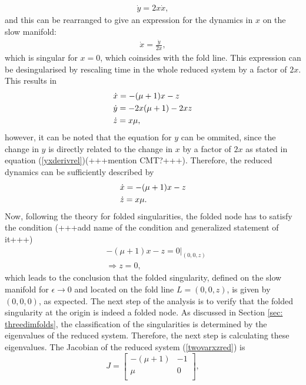 \begin{align} \label{yxderivrel}
\dot{y} = 2x \dot{x},
\end{align}
 and this can be rearranged to give an expression for the dynamics in $x$ on the slow manifold:
\begin{align*}
\dot{x}= \frac{\dot{y}}{2x},
\end{align*}
which is singular for $x=0$, which coinsides with the fold line.
This expression can be desingularised by rescaling time in the whole reduced system by a factor of $2x$. This results in
\begin{align} \label{fullredsysformmo}
&\dot{x} = -(\mu+1)x - z \notag \\
&\dot{y} = - 2x (\mu +1) -2xz\\
&\dot{z} = x \mu \notag,
\end{align}
however, it can be noted that the equation for $y$ can be ommited, since the change in $y$ is directly related to the change in $x$ by a factor of $2x$ as stated in equation (\ref{yxderivrel})(+++mention CMT?+++). Therefore, the reduced dynamics can be sufficiently described by
\begin{align}\label{twovarxzred}
&\dot{x} = -(\mu+1)x - z\\
&\dot{z} = x \mu. \notag
\end{align}
Now, following the theory for folded singularities, the folded node has to satisfy the condition (+++add name of the condition and generalized statement of it+++)
\begin{align*}
& -(\mu+1)x - z=0 |_{(0,0,z)}\\
&\Rightarrow z=0,
\end{align*}
which leads to the conclusion that the folded singularity, defined on the slow manifold for $\epsilon \to 0$ and located on the fold line $L=(0,0,z)$, is given by $(0,0,0)$, as expected.
The next step of the analysis is to verify that the folded singularity at the origin is indeed a folded node.
As discussed in Section \ref{sec: threedimfolds}, the classification of the singularities is determined by the eigenvalues of the reduced system. Therefore, the next step is calculating these eigenvalues.
The Jacobian of the reduced system (\ref{twovarxzred}) is
\begin{equation}
J=\begin{bmatrix}
-(\mu +1) & -1 \\
\mu & 0 \\
\end{bmatrix},
\end{equation}
